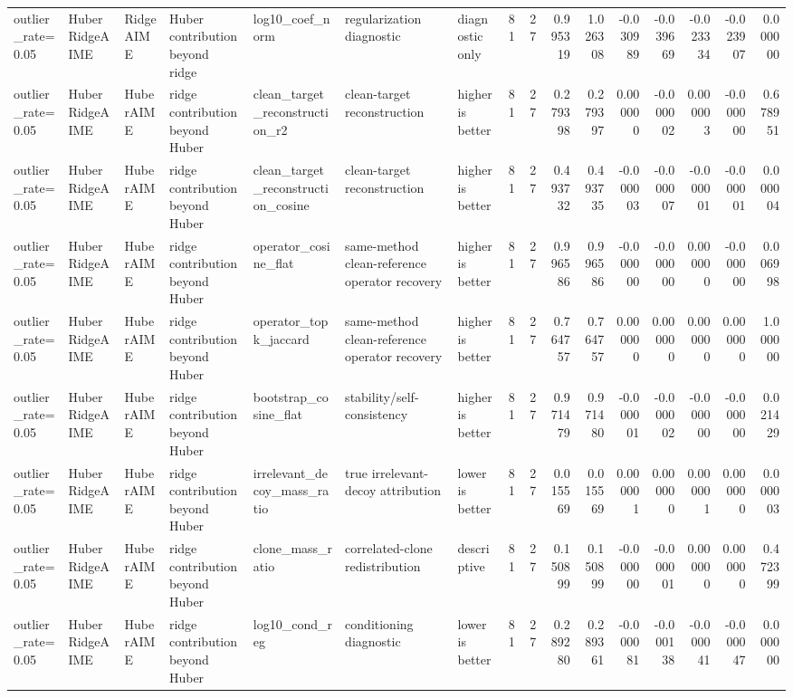 \begin{table}[t]
\begin{tabular}{lllllllrrrrrrrrr}
outlier_rate=0.05 & HuberRidgeAIME & RidgeAIME & Huber contribution beyond ridge & log10_coef_norm & regularization diagnostic & diagnostic only & 81 & 27 & 0.995319 & 1.026308 & -0.030989 & -0.039669 & -0.023334 & -0.023907 & 0.000000 \\
outlier_rate=0.05 & HuberRidgeAIME & HuberAIME & ridge contribution beyond Huber & clean_target_reconstruction_r2 & clean-target reconstruction & higher is better & 81 & 27 & 0.279398 & 0.279397 & 0.000000 & -0.000002 & 0.000003 & -0.000000 & 0.678951 \\
outlier_rate=0.05 & HuberRidgeAIME & HuberAIME & ridge contribution beyond Huber & clean_target_reconstruction_cosine & clean-target reconstruction & higher is better & 81 & 27 & 0.493732 & 0.493735 & -0.000003 & -0.000007 & -0.000001 & -0.000001 & 0.000004 \\
outlier_rate=0.05 & HuberRidgeAIME & HuberAIME & ridge contribution beyond Huber & operator_cosine_flat & same-method clean-reference operator recovery & higher is better & 81 & 27 & 0.996586 & 0.996586 & -0.000000 & -0.000000 & 0.000000 & -0.000000 & 0.006998 \\
outlier_rate=0.05 & HuberRidgeAIME & HuberAIME & ridge contribution beyond Huber & operator_topk_jaccard & same-method clean-reference operator recovery & higher is better & 81 & 27 & 0.764757 & 0.764757 & 0.000000 & 0.000000 & 0.000000 & 0.000000 & 1.000000 \\
outlier_rate=0.05 & HuberRidgeAIME & HuberAIME & ridge contribution beyond Huber & bootstrap_cosine_flat & stability/self-consistency & higher is better & 81 & 27 & 0.971479 & 0.971480 & -0.000001 & -0.000002 & -0.000000 & -0.000000 & 0.021429 \\
outlier_rate=0.05 & HuberRidgeAIME & HuberAIME & ridge contribution beyond Huber & irrelevant_decoy_mass_ratio & true irrelevant-decoy attribution & lower is better & 81 & 27 & 0.015569 & 0.015569 & 0.000001 & 0.000000 & 0.000001 & 0.000000 & 0.000003 \\
outlier_rate=0.05 & HuberRidgeAIME & HuberAIME & ridge contribution beyond Huber & clone_mass_ratio & correlated-clone redistribution & descriptive & 81 & 27 & 0.150899 & 0.150899 & -0.000000 & -0.000001 & 0.000000 & 0.000000 & 0.472399 \\
outlier_rate=0.05 & HuberRidgeAIME & HuberAIME & ridge contribution beyond Huber & log10_cond_reg & conditioning diagnostic & lower is better & 81 & 27 & 0.289280 & 0.289361 & -0.000081 & -0.000138 & -0.000041 & -0.000047 & 0.000000 \\

\end{tabular}
\end{table}
